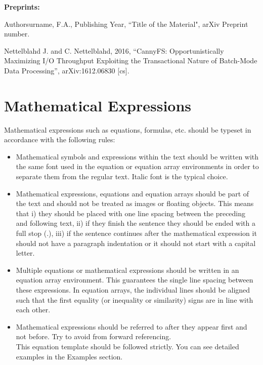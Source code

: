 \documentclass[a4paper,oneside,12pt]{report}
\numberwithin{equation}{chapter}
\begin{document}
\leftskip 5mm \parindent -5mm \textbf{Preprints:}

\leftskip 5mm \parindent -5mm Authorsurname, F.A., Publishing Year, ``Title of the 
Material", arXiv Preprint number.

\leftskip 5mm \parindent -5mm Nettelblahd J. and C. Nettelblahd, 2016, “CannyFS: Opportunistically Maximizing I/O Throughput Exploiting the Transactional Nature of Batch-Mode Data Processing”, arXiv:1612.06830 [cs].

\leftskip -5mm
\parindent 10mm

\section{Mathematical Expressions}
Mathematical expressions such as equations, formulas, etc. should be typeset in accordance with the following rules:

\begin{itemize}
\item Mathematical symbols and expressions within the text should be written with the same font used in the equation or equation array environments in order to separate them from the regular text. Italic font is the typical choice. \\

\item  Mathematical expressions, equations and equation arrays should be part of the text and should not be treated as images or floating objects. This means that i) they should be placed with one line spacing between the preceding and following text, ii) if they finish the sentence they should be ended with a full stop (.), iii) if the sentence continues after the mathematical expression it should not have a paragraph indentation or it should not start with a capital letter. \\

\item Multiple equations or mathematical expressions should be written in an equation array environment. This guarantees the single line spacing between these expressions. In equation arrays, the individual lines should be aligned such that the first equality (or inequality or similarity) signs are in line with each other.\\

\item Mathematical expressions should be referred to after they appear first and not before. Try to avoid from forward referencing. \\

This equation template should be followed strictly. You can see detailed examples in the Examples section.

\end{itemize}
\end{document}

